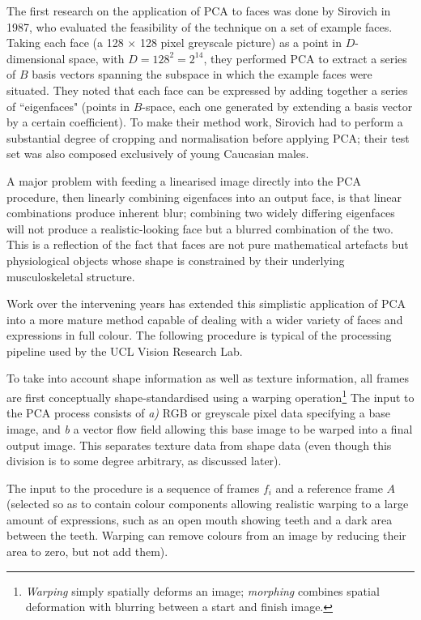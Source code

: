 The first research on the application of PCA to faces was done by Sirovich \etal in 1987\cite{sirovich1987low}, who evaluated the feasibility of the technique on a set of example faces. Taking each face (a 128 $\times$ 128 pixel greyscale picture) as a point in $D$-dimensional space, with $D= 128^2 = 2^{14}$, they performed PCA to extract a series of $B$ basis vectors spanning the subspace in which the example faces were situated. They noted that each face can be expressed
by adding together a series of ``eigenfaces" (points in $B$-space, each one generated by extending a basis vector by a certain coefficient). To make their method work, Sirovich \etal had to perform a substantial degree of cropping and normalisation before applying PCA; their test set was also composed exclusively of young Caucasian males.

A major problem with feeding a linearised image directly into the PCA procedure, then linearly combining eigenfaces into an output face, is that linear combinations produce inherent blur; combining two widely differing eigenfaces will not produce a realistic-looking face but a blurred combination of the two. This is a reflection of the fact that faces are not pure mathematical artefacts but physiological objects whose shape is constrained by their underlying musculoskeletal structure.

Work over the intervening years has extended this simplistic application of PCA into a more mature method capable of dealing with a wider variety of faces and expressions in full colour. The following procedure is typical of the processing pipeline used by the UCL Vision Research Lab.

To take into account shape information as well as texture information, all frames are first conceptually shape-standardised using a warping operation\footnote{\textit{Warping} simply spatially deforms an image; \textit{morphing} combines spatial deformation with blurring between a start and finish image.} The input to the PCA process consists of \textit{a)} RGB or greyscale pixel data specifying a base image, and \textit{b} a vector flow field allowing this base image to be warped into a final output image. This separates texture data from shape data (even though this division is to some degree arbitrary, as discussed later). 

The input to the procedure is a sequence of frames $f_i$ and a reference frame $A$ (selected so as to contain colour components allowing realistic warping to a large amount of expressions, such as an open mouth showing teeth and a dark area between the teeth. Warping can remove colours from an image by reducing their area to zero, but not add them).

